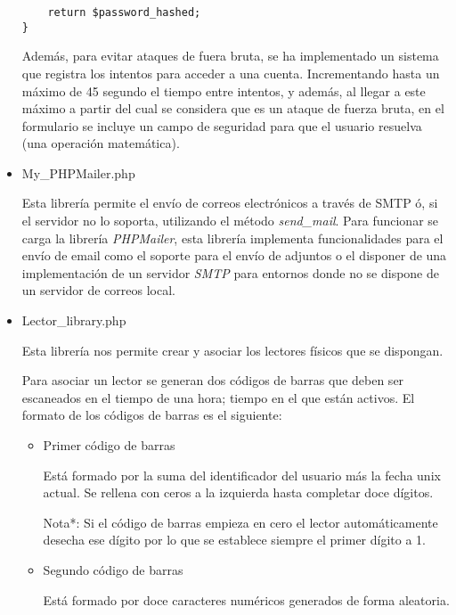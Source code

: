 \begin{itemize}
\begin{lstlisting}
    return $password_hashed;
}
            \end{lstlisting}

            Además, para evitar ataques de fuera bruta, se ha implementado un sistema que registra los intentos para acceder a una cuenta. Incrementando hasta un máximo de 45 segundo el tiempo entre intentos, y además, al llegar a este máximo a partir del cual se considera que es un ataque de fuerza bruta, en el formulario se incluye un campo de seguridad para que el usuario resuelva (una operación matemática).

        \item My\_PHPMailer.php

            Esta librería permite el envío de correos electrónicos a través de SMTP ó, si el servidor no lo soporta, utilizando el método \emph{send\_mail}. Para funcionar se carga la librería \emph{PHPMailer}, esta librería implementa funcionalidades para el envío de email como el soporte para el envío de adjuntos o el disponer de una implementación de un servidor \emph{SMTP} para entornos donde no se dispone de un servidor de correos local.

        \item Lector\_library.php

            Esta librería nos permite crear y asociar los lectores físicos que se dispongan.

            Para asociar un lector se generan dos códigos de barras que deben ser escaneados en el tiempo de una hora; tiempo en el que están activos. El formato de los códigos de barras es el siguiente:

            \begin{itemize}
                \item Primer código de barras

                    Está formado por la suma del identificador del usuario más la fecha unix actual. Se rellena con ceros a la izquierda hasta completar doce dígitos.

                    Nota*: Si el código de barras empieza en cero el lector automáticamente desecha ese dígito por lo que se establece siempre el primer dígito a 1.

                \item Segundo código de barras

                    Está formado por doce caracteres numéricos generados de forma aleatoria.
            \end{itemize}


\end{itemize}
